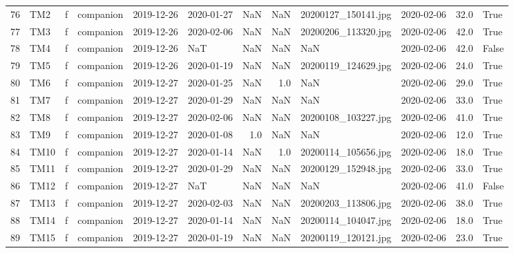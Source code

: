 \begin{longtable}{llllllrrllrl}
76 &    TM2 &   f &  companion &   2019-12-26 & 2020-01-27 &               NaN &                  NaN &      20200127\_150141.jpg &        2020-02-06 &  32.0 &   True \\
77 &    TM3 &   f &  companion &   2019-12-26 & 2020-02-06 &               NaN &                  NaN &      20200206\_113320.jpg &        2020-02-06 &  42.0 &   True \\
78 &    TM4 &   f &  companion &   2019-12-26 &        NaT &               NaN &                  NaN &                      NaN &        2020-02-06 &  42.0 &  False \\
79 &    TM5 &   f &  companion &   2019-12-26 & 2020-01-19 &               NaN &                  NaN &      20200119\_124629.jpg &        2020-02-06 &  24.0 &   True \\
80 &    TM6 &   f &  companion &   2019-12-27 & 2020-01-25 &               NaN &                  1.0 &                      NaN &        2020-02-06 &  29.0 &   True \\
81 &    TM7 &   f &  companion &   2019-12-27 & 2020-01-29 &               NaN &                  NaN &                      NaN &        2020-02-06 &  33.0 &   True \\
82 &    TM8 &   f &  companion &   2019-12-27 & 2020-02-06 &               NaN &                  NaN &      20200108\_103227.jpg &        2020-02-06 &  41.0 &   True \\
83 &    TM9 &   f &  companion &   2019-12-27 & 2020-01-08 &               1.0 &                  NaN &                      NaN &        2020-02-06 &  12.0 &   True \\
84 &   TM10 &   f &  companion &   2019-12-27 & 2020-01-14 &               NaN &                  1.0 &      20200114\_105656.jpg &        2020-02-06 &  18.0 &   True \\
85 &   TM11 &   f &  companion &   2019-12-27 & 2020-01-29 &               NaN &                  NaN &      20200129\_152948.jpg &        2020-02-06 &  33.0 &   True \\
86 &   TM12 &   f &  companion &   2019-12-27 &        NaT &               NaN &                  NaN &                      NaN &        2020-02-06 &  41.0 &  False \\
87 &   TM13 &   f &  companion &   2019-12-27 & 2020-02-03 &               NaN &                  NaN &      20200203\_113806.jpg &        2020-02-06 &  38.0 &   True \\
88 &   TM14 &   f &  companion &   2019-12-27 & 2020-01-14 &               NaN &                  NaN &      20200114\_104047.jpg &        2020-02-06 &  18.0 &   True \\
89 &   TM15 &   f &  companion &   2019-12-27 & 2020-01-19 &               NaN &                  NaN &      20200119\_120121.jpg &        2020-02-06 &  23.0 &   True \\
\end{longtable}
